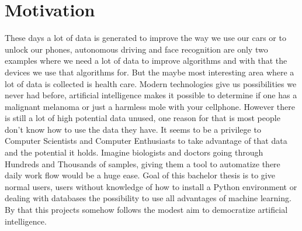 \chapter{Motivation}

These days a lot of data is generated to improve the way we use our cars or to unlock our phones, autonomous driving and face recognition are only two examples where we need a lot of data to improve algorithms and with that the devices we use that algorithms for. But the maybe most interesting area where a lot of data is collected is health care. Modern technologies give us possibilities we never had before, artificial intelligence makes it possible to determine if one has a malignant melanoma
or just a harmless mole with your cellphone. However there is still a lot of high potential data unused, one reason for that is most people don't know how to use the data they have. It seems to be a privilege to Computer Scientists and Computer Enthusiasts to take advantage of that data and the potential it holds. Imagine biologists and doctors going through Hundreds and Thousands of samples, giving them a tool to automatize there daily work flow would be a huge ease. Goal of this bachelor thesis is to give normal users, users without knowledge of how to install a Python environment or dealing with databases the possibility to use all advantages of machine learning. By that this projects somehow follows the modest aim to democratize artificial intelligence.